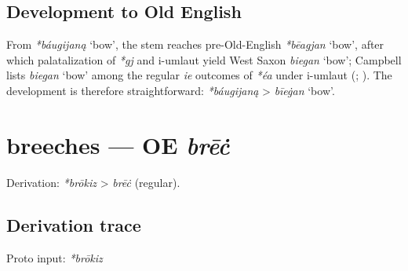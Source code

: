 \documentclass[
  british,
  a4paper,
  openany]{book}
\providecommand{\Recon}[1]{\emph{*#1}}
{\catcode`→=\active \global\def→{\ensuremath{\rightarrow}}}
\providecommand{\texorpdfstring}[2]{#1}
\providecommand{\Recon}[1]{\emph{*#1}}
{\catcode`→=\active \global\def→{\ensuremath{\rightarrow}}}
\begin{document}
\subsection{Development to Old
English}\label{development-to-old-english-8}

From \Recon{báugijaną} `bow', the stem reaches pre-Old-English
\Recon{bēagjan} `bow', after which palatalization of \emph{*gj} and
i-umlaut yield West Saxon \emph{biegan} `bow'; Campbell lists
\emph{biegan} `bow' among the regular \emph{ie} outcomes of \emph{*éa}
under i-umlaut (;
). The development is
therefore straightforward: \emph{*báugijaną} \textgreater{}
\emph{bīeġan} `bow'.

\section{\texorpdfstring{breeches --- OE
\emph{brēċ}}{breeches --- OE brēċ}}\label{breeches-oe-brux113ux10b}


Derivation: \emph{*brōkiz} \textgreater{} \emph{brēċ} (regular).

\subsection{Derivation trace}\label{derivation-trace-9}

Proto input: \emph{*brōkiz}

\begingroup
\setlength{\fboxsep}{6pt}
\end{document}
